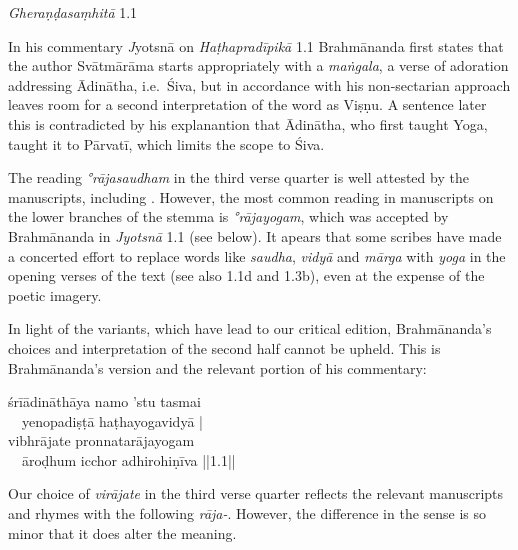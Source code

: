 \begin{ekdosis}
\begin{testimonia}[hp01_001]
\emph{Gheraṇḍasaṃhitā} 1.1

\begin{versinnote}
\end{versinnote}

\end{testimonia}

\begin{philcomm}[hp01_001]

In his commentary {\emph Jyotsnā} on \emph{Haṭhapradīpikā} 1.1 Brahmānanda first states that the
author Svātmārāma starts appropriately with a \emph{maṅgala}, a verse of adoration addressing
Ādinātha, i.e.\ Śiva, but in accordance with his non-sectarian approach leaves room for a second
interpretation of the word as Viṣṇu. A sentence later this is contradicted by his explanantion that Ādinātha, who first taught Yoga, taught it to Pārvatī, which limits the scope to Śiva.

The reading \emph{°rājasaudham} in the third verse quarter is well attested by the manuscripts, including \alphaOne. However, the most common reading in manuscripts on the lower branches of the stemma is \emph{°rājayogam}, which was accepted by Brahmānanda in \emph{Jyotsnā} 1.1 (see below). It apears that some scribes have made a concerted effort to replace words like \emph{saudha}, \emph{vidyā} and \emph{mārga} with \emph{yoga} in the opening verses of the text (see also 1.1d and 1.3b), even at the expense of the poetic imagery.

In light of the variants, which have lead to our critical edition, Brahmānanda's choices and
interpretation of the second half cannot be upheld. This is Brahmānanda's version and the relevant
portion of his commentary:

\begin{versinnote}
śrīādināthāya namo 'stu tasmai\\ 
\ \ yenopadiṣṭā haṭhayogavidyā |\\
vibhrājate pronnatarājayogam\\ 
\ \ āroḍhum icchor adhirohiṇīva ||1.1||
\end{versinnote}

Our choice of \emph{virājate} in the third verse quarter reflects the relevant manuscripts and rhymes with the following \emph{rāja-}. However, the difference in the sense is so minor that it does alter the meaning.


\end{philcomm}
\end{ekdosis}
